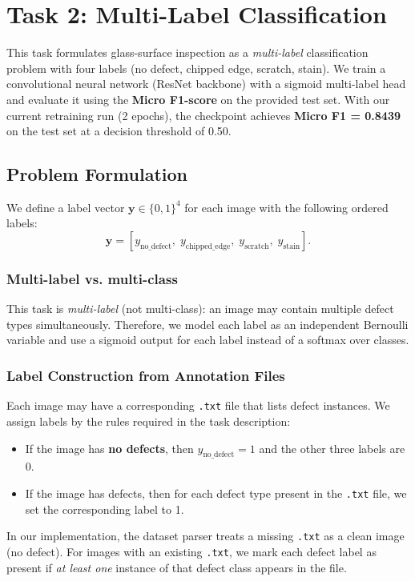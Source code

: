 \section{Task 2: Multi-Label Classification}
This task formulates glass-surface inspection as a \emph{multi-label} classification problem with four labels (no defect, chipped edge, scratch, stain). We train a convolutional neural network (ResNet backbone) with a sigmoid multi-label head and evaluate it using the \textbf{Micro F1-score} on the provided test set. With our current retraining run (2 epochs), the checkpoint achieves \textbf{Micro F1 = 0.8439} on the test set at a decision threshold of 0.50.

\subsection{Problem Formulation}
We define a label vector $\mathbf{y}\in\{0,1\}^4$ for each image with the following ordered labels:
\[
\mathbf{y} = [y_{\text{no\_defect}},\; y_{\text{chipped\_edge}},\; y_{\text{scratch}},\; y_{\text{stain}}].
\]

\subsubsection{Multi-label vs. multi-class}
This task is \emph{multi-label} (not multi-class): an image may contain multiple defect types simultaneously. Therefore, we model each label as an independent Bernoulli variable and use a sigmoid output for each label instead of a softmax over classes.

\subsubsection{Label Construction from Annotation Files}
Each image may have a corresponding \texttt{.txt} file that lists defect instances. We assign labels by the rules required in the task description:
\begin{itemize}
  \item If the image has \textbf{no defects}, then $y_{\text{no\_defect}}=1$ and the other three labels are 0.
  \item If the image has defects, then for each defect type present in the \texttt{.txt} file, we set the corresponding label to 1.
\end{itemize}

In our implementation, the dataset parser treats a missing \texttt{.txt} as a clean image (no defect). For images with an existing \texttt{.txt}, we mark each defect label as present if \emph{at least one} instance of that defect class appears in the file.

